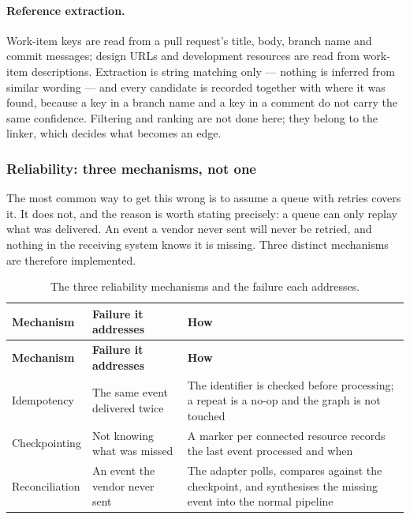 \paragraph{Reference extraction.} Work-item keys are read from a pull request's
title, body, branch name and commit messages; design URLs and development
resources are read from work-item descriptions. Extraction is string matching
only --- nothing is inferred from similar wording --- and every candidate is
recorded together with where it was found, because a key in a branch name and a
key in a comment do not carry the same confidence. Filtering and ranking are
not done here; they belong to the linker, which decides what becomes an edge.

\subsubsection{Reliability: three mechanisms, not one}

The most common way to get this wrong is to assume a queue with retries covers
it. It does not, and the reason is worth stating precisely: a queue can only
replay what was delivered. An event a vendor never sent will never be retried,
and nothing in the receiving system knows it is missing. Three distinct
mechanisms are therefore implemented.

\begin{longtable}{>{\raggedright\arraybackslash}p{} >{\raggedright\arraybackslash}p{} >{\raggedright\arraybackslash}p{}}
\caption{The three reliability mechanisms and the failure each addresses.}\label{tab:reliability-mechanisms}\\
\hline\textbf{Mechanism} & \textbf{Failure it addresses} & \textbf{How} \\
\hline\endfirsthead
\hline\textbf{Mechanism} & \textbf{Failure it addresses} & \textbf{How} \\
\hline\endhead
Idempotency & The same event delivered twice & The identifier is checked before
  processing; a repeat is a no-op and the graph is not touched \\
Checkpointing & Not knowing what was missed & A marker per connected resource
  records the last event processed and when \\
Reconciliation & An event the vendor never sent & The adapter polls, compares
  against the checkpoint, and synthesises the missing event into the normal
  pipeline \\
\hline\end{longtable}


